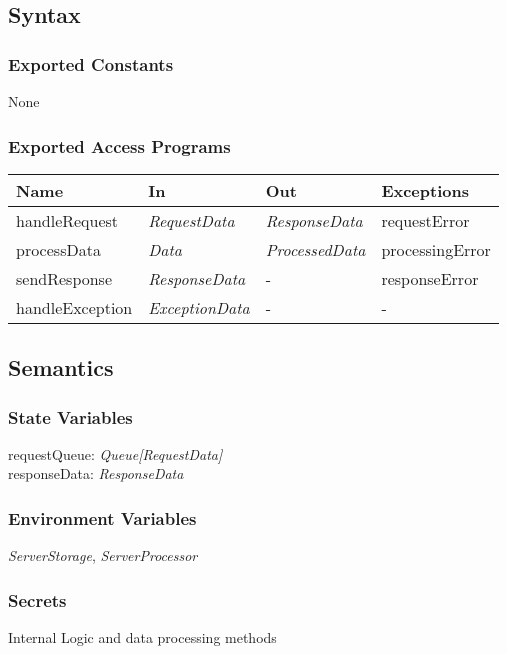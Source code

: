 \documentclass[12pt, titlepage]{article}
\begin{document}
\subsection{Syntax}

\subsubsection{Exported Constants}
None

\subsubsection{Exported Access Programs}

\begin{center}
\begin{tabular}{p{4cm} p{3cm} p{3cm} p{3cm}}
\hline
\textbf{Name} & \textbf{In} & \textbf{Out} & \textbf{Exceptions} \\
\hline
handleRequest & \textit{RequestData} & \textit{ResponseData} & requestError \\
processData & \textit{Data} & \textit{ProcessedData} & processingError \\
sendResponse & \textit{ResponseData} & - & responseError \\
handleException & \textit{ExceptionData} & - & - \\
\hline
\end{tabular}
\end{center}

\subsection{Semantics}

\subsubsection{State Variables}

requestQueue: \textit{Queue[RequestData]}\\
responseData: \textit{ResponseData}

\subsubsection{Environment Variables}

\textit{ServerStorage}, \textit{ServerProcessor}

\subsubsection{Secrets}
Internal Logic and data processing methods
\end{document}
